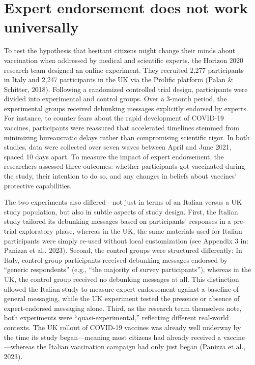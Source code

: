 \documentclass[authordate, reflection,issue]{jote-new-article}
\begin{document}
	\section{Expert endorsement does not work universally}



	To test the hypothesis that hesitant citizens might change their minds about vaccination when addressed by medical and scientific experts, the Horizon 2020 research team designed an online experiment. They recruited 2,277 participants in Italy and 2,247 participants in the UK via the Prolific platform (Palan \& Schitter, 2018). Following a randomized controlled trial design, participants were divided into experimental and control groups. Over a 3-month period, the experimental groups received debunking messages explicitly endorsed by experts. For instance, to counter fears about the rapid development of COVID-19 vaccines, participants were reassured that accelerated timelines stemmed from minimizing bureaucratic delays rather than compromising scientific rigor. In both studies, data were collected over seven waves between April and June 2021, spaced 10 days apart. To measure the impact of expert endorsement, the researchers assessed three outcomes: whether participants got vaccinated during the study, their intention to do so, and any changes in beliefs about vaccines' protective capabilities.







	The two experiments also differed—not just in terms of an Italian versus a UK study population, but also in subtle aspects of study design. First, the Italian study tailored its debunking messages based on participants' responses in a pre-trial exploratory phase, whereas in the UK, the same materials used for Italian participants were simply re-used without local customization (see Appendix 3 in: Panizza et al., 2023). Second, the control groups were structured differently: In Italy, control group participants received debunking messages endorsed by “generic respondents” (e.g., “the majority of survey participants”), whereas in the UK, the control group received no debunking messages at all. This distinction allowed the Italian study to measure expert endorsement against a baseline of general messaging, while the UK experiment tested the presence or absence of expert-endorsed messaging alone. Third, as the research team themselves note, both experiments were “quasi-experimental,” reflecting different real-world contexts. The UK rollout of COVID-19 vaccines was already well underway by the time its study began—meaning most citizens had already received a vaccine—whereas the Italian vaccination campaign had only just began (Panizza et al., 2023).
\end{document}
